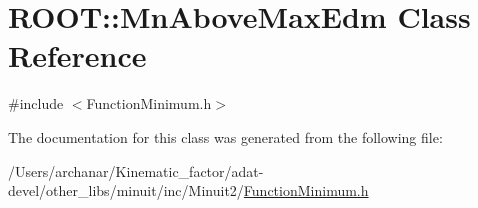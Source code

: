\hypertarget{classROOT_1_1Minuit2_1_1FunctionMinimum_1_1MnAboveMaxEdm}{}\section{R\+O\+OT\+:\+:Mn\+Above\+Max\+Edm Class Reference}
\label{classROOT_1_1Minuit2_1_1FunctionMinimum_1_1MnAboveMaxEdm}


{\ttfamily \#include $<$Function\+Minimum.\+h$>$}



The documentation for this class was generated from the following file\+:\begin{DoxyCompactItemize}
\item 
/\+Users/archanar/\+Kinematic\+\_\+factor/adat-\/devel/other\+\_\+libs/minuit/inc/\+Minuit2/\mbox{\hyperlink{adat-devel_2other__libs_2minuit_2inc_2Minuit2_2FunctionMinimum_8h}{Function\+Minimum.\+h}}\end{DoxyCompactItemize}
